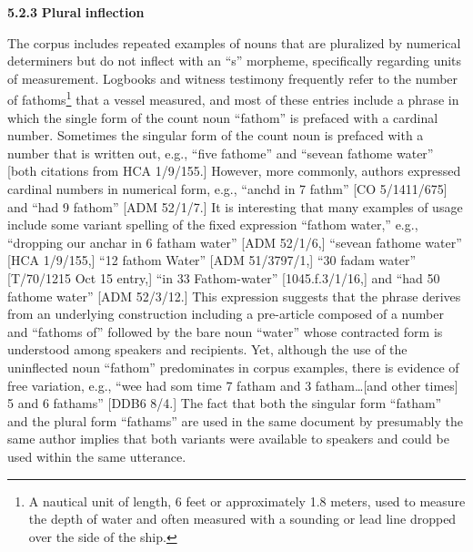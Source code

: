 \textbf{5.2.3} \textbf{Plural} \textbf{inflection}

The corpus includes repeated examples of nouns that are pluralized by numerical determiners but do not inflect with an “s” morpheme, specifically regarding units of measurement. Logbooks and witness testimony frequently refer to the number of fathoms\footnote{A nautical unit of length, 6 feet or approximately 1.8 meters, used to measure the depth of water and often measured with a sounding or lead line dropped over the side of the ship.} that a vessel measured, and most of these entries include a phrase in which the single form of the count noun “fathom” is prefaced with a cardinal number. Sometimes the singular form of the count noun is prefaced with a number that is written out, e.g., “five fathome” and “sevean fathome water” [both citations from HCA 1/9/155.] However, more commonly, authors expressed cardinal numbers in numerical form, e.g., “anchd in 7 fathm” [CO 5/1411/675] and “had 9 fathom” [ADM 52/1/7.] It is interesting that many examples of usage include some variant spelling of the fixed expression “fathom water,” e.g., “dropping our anchar in 6 fatham water” [ADM 52/1/6,] “sevean fathome water” [HCA 1/9/155,] “12 fathom Water” [ADM 51/3797/1,] “30 fadam water” [T/70/1215 Oct 15 entry,] “in 33 Fathom-water” [1045.f.3/1/16,] and “had 50 fathome water” [ADM 52/3/12.] This expression suggests that the phrase derives from an underlying construction including a pre-article composed of a number and “fathoms of” followed by the bare noun “water” whose contracted form is understood among speakers and recipients. Yet, although the use of the uninflected noun “fathom” predominates in corpus examples, there is evidence of free variation, e.g., “wee had som time 7 fatham and 3 fatham…[and other times] 5 and 6 fathams” [DDB6 8/4.] The fact that both the singular form “fatham” and the plural form “fathams” are used in the same document by presumably the same author implies that both variants were available to speakers and could be used within the same utterance. 

